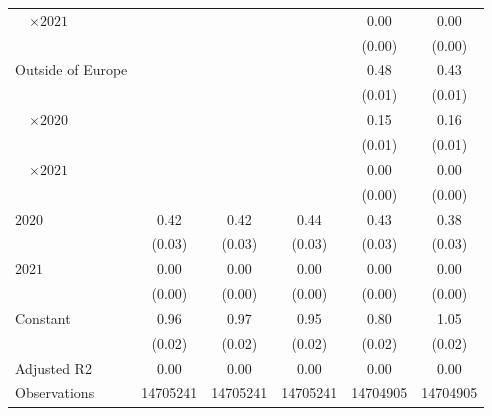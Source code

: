\begin{tabular}{@{}l*{5}{S[table-format={-}2.2{\tnote{***}}]}@{}}
~~\(\times 2021\) &  &  &  & 0.00 & \vphantom{1} 0.00\tabularnewline%
 &  &  &  & (0.00) & \vphantom{1} (0.00)\tabularnewline%
Outside of Europe &  &  &  & 0.48\tnote{***} & 0.43\tnote{***}\tabularnewline%
 &  &  &  & (0.01) & \vphantom{1} (0.01)\tabularnewline%
~~\(\times 2020\) &  &  &  & 0.15\tnote{***} & 0.16\tnote{***}\tabularnewline%
 &  &  &  & (0.01) & (0.01)\tabularnewline%
~~\(\times 2021\) &  &  &  & 0.00 & 0.00\tabularnewline%
 &  &  &  & (0.00) & (0.00)\tabularnewline%
\midrule
\(2020\) & 0.42\tnote{***} & 0.42\tnote{***} & 0.44\tnote{***} & 0.43\tnote{***} & 0.38\tnote{***}\tabularnewline%
 & (0.03) & (0.03) & (0.03) & (0.03) & (0.03)\tabularnewline%
\(2021\) & 0.00 & 0.00 & 0.00 & 0.00 & 0.00\tabularnewline%
 & (0.00) & (0.00) & (0.00) & (0.00) & (0.00)\tabularnewline%
Constant & 0.96\tnote{***} & 0.97\tnote{***} & 0.95\tnote{***} & 0.80\tnote{***} & 1.05\tnote{***}\tabularnewline%
 & (0.02) & (0.02) & (0.02) & (0.02) & (0.02)\tabularnewline%
\midrule
Adjusted R2 & 0.00 & 0.00 & 0.00 & 0.00 & 0.00\tabularnewline%
Observations & {\num{14705241}} & {\num{14705241}} & {\num{14705241}} & {\num{14704905}} & {\num{14704905}}\tabularnewline%
\bottomrule
\end{tabular}
